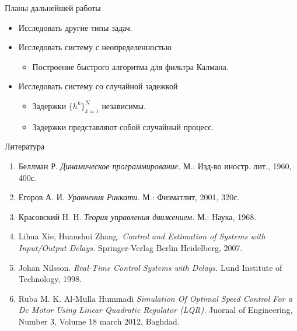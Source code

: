         \begin{frame}{Планы дальнейшей работы}
                \begin{itemize}
                        \item<1-> Исследовать другие типы задач.
                        \item<2-> Исследовать систему с неопределенностью
                                \begin{itemize}
                                        \item Построение быстрого алгоритма для фильтра Калмана.
                                \end{itemize}
                        \item<3-> Исследовать систему со случайной задежкой
                                \begin{itemize}
                                        \item Задержки $\{h^k\}_{k=1}^N$ независимы.
                                        \item Задержки представляют собой случайный процесс.
                                \end{itemize}
                \end{itemize}
        \end{frame}
        \begin{frame}{Литература}
                \begin{enumerate}
                \item Беллман Р. \textit{Динамическое программирование.} М.: Изд-во иностр. лит., 1960, 400с.

                \item  Егоров А. И. \textit{Уравнения Риккати.} М.: Физматлит, 2001, 320с.

                \item Красовский Н. Н. \textit{Теория управления движением.} М.: Наука, 1968.

                \item Lihua Xie, Huanshui Zhang. \textit{Control and Estimation of Systems with Input/Output Delays.} Springer-Verlag  Berlin Heidelberg, 2007.

                \item Johan Nilsson. \textit{Real-Time Control Systems with Delays.} Lund Institute of Technology, 1998.

                \item Ruba M. K. Al-Mulla Hummadi \textit{Simulation Of Optimal Speed Control For a Dc Motor Using Linear Quadratic Regulator (LQR).} Juornal of Engineering, Number 3, Volume 18 march 2012, Baghdad.
                \end{enumerate}
        \end{frame}
